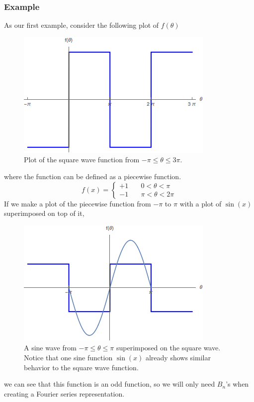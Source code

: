 \documentclass{article}
\newcommand{\be}{\begin{equation}}
\newcommand{\ee}{\end{equation}}
\begin{document}
\subsubsection*{Example}
As our first example, consider the following plot of $f(\theta)$
\begin{figure}[H]
  \centering
  \includegraphics[scale=0.7]{figures/SquareWave.png}
    \caption{Plot of the square wave function from $- \pi \leq \theta \leq 3 \pi$.}
\end{figure}
where the function can be defined as a piecewise function.
\be
  f(x) =
  \left\{
    \begin{array}{ll}
      +1 & \quad 0 < \theta < \pi \\
      -1 & \quad \pi < \theta < 2 \pi
    \end{array}
  \right.
\ee
If we make a plot of the piecewise function from $- \pi$ to $\pi$ with a plot of $\sin(x)$ superimposed on top of it,
\begin{figure}[H]
  \centering
  \includegraphics[scale=0.7]{figures/square_sin_plot.png}
    \caption{A sine wave from $- \pi \leq \theta \leq \pi$ superimposed on the square wave. Notice that one sine function $\sin(x)$ already shows similar behavior to the square wave function.}
\end{figure}
we can see that this function is an odd function, so we will only need $B_n$'s when creating a Fourier series representation.
\end{document}
